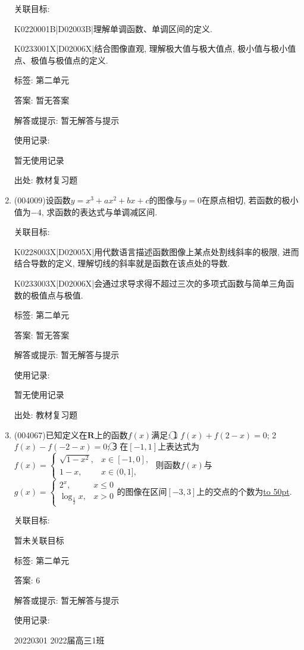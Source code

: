 \documentclass[10pt,a4paper]{article}
\newcommand{\blank}[1]{\underline{\hbox to #1pt{}}}
\begin{document}
\begin{enumerate}[1.]
关联目标:

K0220001B|D02003B|理解单调函数、单调区间的定义.

K0233001X|D02006X|结合图像直观, 理解极大值与极大值点, 极小值与极小值点、极值与极值点的定义.



标签: 第二单元

答案: 暂无答案

解答或提示: 暂无解答与提示

使用记录:

暂无使用记录


出处: 教材复习题
\item { (004009)}设函数$y=x^3+ax^2+bx+c$的图像与$y=0$在原点相切, 若函数的极小值为$-4$, 求函数的表达式与单调减区间.


关联目标:

K0228003X|D02005X|用代数语言描述函数图像上某点处割线斜率的极限, 进而结合导数的定义, 理解切线的斜率就是函数在该点处的导数.

K0233003X|D02006X|会通过求导求得不超过三次的多项式函数与简单三角函数的极值点与极值.



标签: 第二单元

答案: 暂无答案

解答或提示: 暂无解答与提示

使用记录:

暂无使用记录


出处: 教材复习题
\item { (004067)}已知定义在$\mathbf{R}$上的函数$f(x)$满足: \textcircled{1} $f(x)+f(2-x)=0$; \textcircled{2} $f(x)-f(-2-x)=0$; \textcircled{3} 在$[-1,1]$上表达式为$f(x)=\begin{cases} \sqrt{1-x^2}, & x\in [-1,0], \\ 1-x, & x\in (0,1], \end{cases}$ 则函数$f(x)$与$g(x)=\begin{cases} {2^x}, & x\le 0 \\ \log_\frac 12x, & x>0 \end{cases}$的图像在区间$[-3,3]$上的交点的个数为\blank{50}.


关联目标:

暂未关联目标



标签: 第二单元

答案: $6$

解答或提示: 暂无解答与提示

使用记录:

20220301	2022届高三1班	



\end{enumerate}
\end{document}
